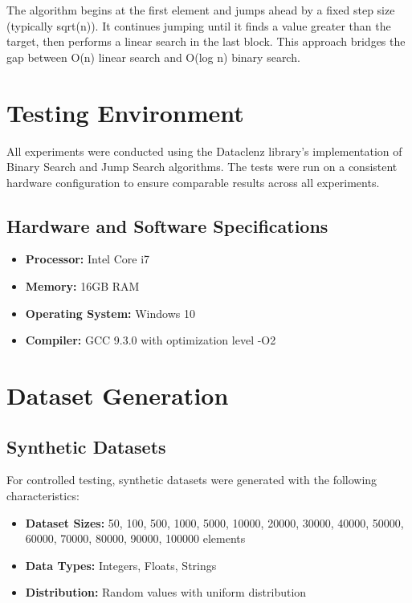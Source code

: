 The algorithm begins at the first element and jumps ahead by a fixed step size (typically sqrt(n)). It continues jumping until it finds a value greater than the target, then performs a linear search in the last block. This approach bridges the gap between O(n) linear search and O(log n) binary search.

\section{Testing Environment}

All experiments were conducted using the Dataclenz library's implementation of Binary Search and Jump Search algorithms. The tests were run on a consistent hardware configuration to ensure comparable results across all experiments.

\subsection{Hardware and Software Specifications}
\begin{itemize}
    \item \textbf{Processor:} Intel Core i7
    \item \textbf{Memory:} 16GB RAM
    \item \textbf{Operating System:} Windows 10
    \item \textbf{Compiler:} GCC 9.3.0 with optimization level -O2
\end{itemize}

\section{Dataset Generation}

\subsection{Synthetic Datasets}
For controlled testing, synthetic datasets were generated with the following characteristics:
\begin{itemize}
    \item \textbf{Dataset Sizes:} 50, 100, 500, 1000, 5000, 10000, 20000, 30000, 40000, 50000, 60000, 70000, 80000, 90000, 100000 elements
    \item \textbf{Data Types:} Integers, Floats, Strings
    \item \textbf{Distribution:} Random values with uniform distribution
\end{itemize}

